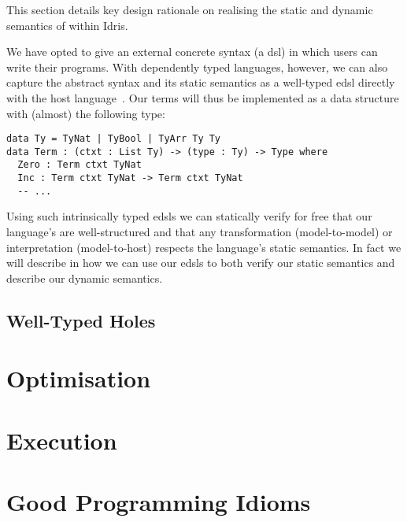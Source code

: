 \documentclass[%
draft, %
a4paper,
UKenglish,
cleveref,
autoref,
thm-restate,
pdfa
]{oasics-v2021}
\begin{document}
This section details key design rationale on realising the static and dynamic semantics of \Velo{} within Idris.

We have opted to give \Velo{} an external concrete syntax (a \ac{dsl}) in which users can write their programs.
%
With dependently typed languages, however, we can also capture the abstract syntax and its static semantics as a well-typed \ac{edsl} directly with the host language~\cite{Augustsson1999edt}.
Our terms will thus be implemented as a data structure with (almost) the following type:

\begin{Verbatim}
data Ty = TyNat | TyBool | TyArr Ty Ty
data Term : (ctxt : List Ty) -> (type : Ty) -> Type where
  Zero : Term ctxt TyNat
  Inc : Term ctxt TyNat -> Term ctxt TyNat
  -- ...
\end{Verbatim}

\noindent

Using such intrinsically typed \acp{edsl} we can statically verify for free that our language's are well-structured and that any transformation (model-to-model) or interpretation (model-to-host) respects the language's static semantics.
In fact we will describe in  how we can use our \acp{edsl} to both verify our static semantics and describe our dynamic semantics.





\subsection{Well-Typed Holes}
\label{sec:design:holes}


\section{Optimisation}
\label{sec:compiler-pass}



\section{Execution}
\label{sec:semantics}


\section{Good Programming Idioms}
\label{sec:idioms}
\end{document}
